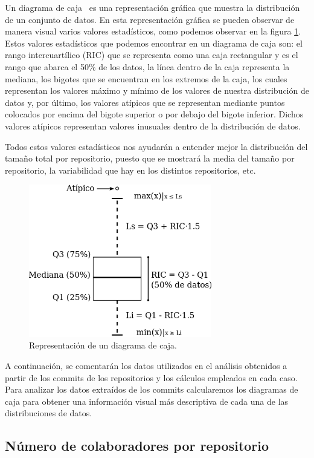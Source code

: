 \documentclass[a4paper, 12pt]{book}
\begin{document}
Un diagrama de caja~\cite{neto2017boxplot} es una representación gráfica que muestra la distribución de un conjunto de datos.
En esta representación gráfica se pueden observar de manera visual varios valores estadísticos, como podemos observar en la figura \ref{fig:boxplot}.
Estos valores estadísticos que podemos encontrar en un diagrama de caja son: el rango intercuartílico (RIC) que se representa como una caja rectangular y es el rango que abarca el 50\% de los datos, la línea dentro de la caja representa la mediana, 
los bigotes que se encuentran en los extremos de la caja, los cuales representan los valores máximo y mínimo de los valores de nuestra distribución de datos y, por último, los valores atípicos que se representan mediante puntos colocados por encima del bigote superior o por debajo del bigote inferior.
Dichos valores atípicos representan valores inusuales dentro de la distribución de datos.


Todos estos valores estadísticos nos ayudarán a entender mejor la distribución del tamaño total por repositorio, puesto que se mostrará la media del tamaño por repositorio, la variabilidad que hay en los distintos repositorios, etc.

\begin{figure}
  \centering
  \includegraphics[width=8cm, keepaspectratio]{img/Boxplot.png}
  \caption{Representación de un diagrama de caja.}\label{fig:boxplot}
\end{figure}

A continuación, se comentarán los datos utilizados en el análisis obtenidos a partir de los commits de los repositorios y los cálculos empleados en cada caso.
Para analizar los datos extraídos de los commits calcularemos los diagramas de caja para obtener una información visual más descriptiva de cada una de las distribuciones de datos.


\subsection{Número de colaboradores por repositorio} %
\label{sec:número de colaboradores por repositorio}
\end{document}
